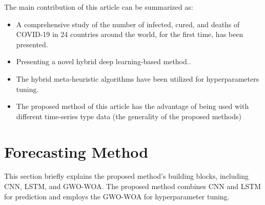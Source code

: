 \documentclass{article}
\begin{document}
The main contribution of this article can be summarized as: 
\begin{itemize}
    \item A comprehensive study of the number of infected, cured, and deaths of COVID-19 in 24 countries around the world, for the first time, has been presented.
    \item Presenting a   novel hybrid deep learning-based method..
    \item The hybrid meta-heuristic algorithms have been utilized for hyperparameters tuning.
    \item The proposed method of this article has the advantage of being used with different time-series type data (the generality of the proposed methods)
\end{itemize}

\section{Forecasting Method}\label{secBasicOfResearch}
This section briefly explains the proposed method's building blocks, including CNN, LSTM, and GWO-WOA. The proposed method combines CNN and LSTM for prediction and employs the GWO-WOA for hyperparameter tuning.
\end{document}
